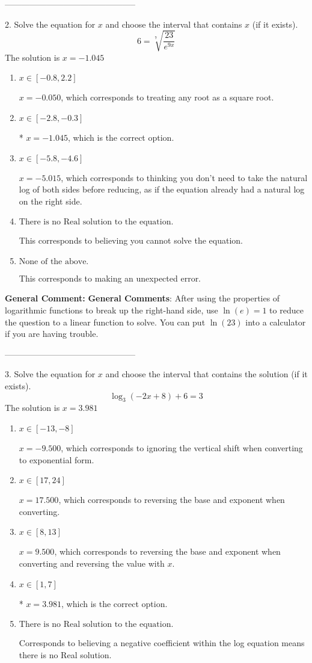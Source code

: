 \documentclass{extbook}[14pt]
\begin{document}
-----------------------------------------------

2.  Solve the equation for $x$ and choose the interval that contains $x$ (if it exists).
\[  6 = \sqrt[7]{\frac{23}{e^{9x}}} \] 
The solution is $ x = -1.045 $ 

\begin{enumerate}[label=\Alph*.] 
\item $ x \in [-0.8, 2.2] $ 

 $x = -0.050$, which corresponds to treating any root as a square root. 
\item $ x \in [-2.8, -0.3] $ 

 * $x = -1.045$, which is the correct option. 
\item $ x \in [-5.8, -4.6] $ 

 $x = -5.015$, which corresponds to thinking you don't need to take the natural log of both sides before reducing, as if the equation already had a natural log on the right side. 
\item $ \text{There is no Real solution to the equation.} $ 

 This corresponds to believing you cannot solve the equation. 
\item $ \text{None of the above.} $ 

 This corresponds to making an unexpected error. 
\end{enumerate} 
 
\textbf{General Comment:} \textbf{General Comments}: After using the properties of logarithmic functions to break up the right-hand side, use $\ln(e) = 1$ to reduce the question to a linear function to solve. You can put $\ln(23)$ into a calculator if you are having trouble. 

-----------------------------------------------

3. Solve the equation for $x$ and choose the interval that contains the solution (if it exists).
\[ \log_{3}{(-2x+8)}+6 = 3 \] 
The solution is $ x = 3.981 $ 

\begin{enumerate}[label=\Alph*.] 
\item $ x \in [-13, -8] $ 

 $x = -9.500$, which corresponds to ignoring the vertical shift when converting to exponential form. 
\item $ x \in [17, 24] $ 

 $x = 17.500$, which corresponds to reversing the base and exponent when converting. 
\item $ x \in [8, 13] $ 

 $x = 9.500$, which corresponds to reversing the base and exponent when converting and reversing the value with $x$. 
\item $ x \in [1, 7] $ 

 * $x = 3.981$, which is the correct option. 
\item $ \text{There is no Real solution to the equation.} $ 

 Corresponds to believing a negative coefficient within the log equation means there is no Real solution. 
\end{enumerate} 
 
\end{document}
